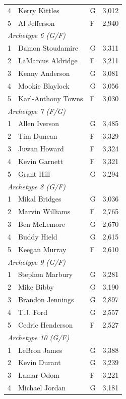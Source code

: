\begin{table}[htbp]
\begin{tabular}{rlll}
    4 & Kerry Kittles & G & 3,012 \\
    5 & Al Jefferson & F & 2,940 \\
    \midrule[0.4pt]
    \multicolumn{4}{l}{\textit{Archetype 6 (G/F)}} \\
    \midrule
    1 & Damon Stoudamire & G & 3,311 \\
    2 & LaMarcus Aldridge & F & 3,211 \\
    3 & Kenny Anderson & G & 3,081 \\
    4 & Mookie Blaylock & G & 3,056 \\
    5 & Karl-Anthony Towns & F & 3,030 \\
    \midrule[0.4pt]
    \multicolumn{4}{l}{\textit{Archetype 7 (F/G)}} \\
    \midrule
    1 & Allen Iverson & G & 3,485 \\
    2 & Tim Duncan & F & 3,329 \\
    3 & Juwan Howard & F & 3,324 \\
    4 & Kevin Garnett & F & 3,321 \\
    5 & Grant Hill & G & 3,294 \\
    \midrule[0.4pt]
    \multicolumn{4}{l}{\textit{Archetype 8 (G/F)}} \\
    \midrule
    1 & Mikal Bridges & G & 3,036 \\
    2 & Marvin Williams & F & 2,765 \\
    3 & Ben McLemore & G & 2,670 \\
    4 & Buddy Hield & G & 2,615 \\
    5 & Keegan Murray & F & 2,610 \\
    \midrule[0.4pt]
    \multicolumn{4}{l}{\textit{Archetype 9 (G/F)}} \\
    \midrule
    1 & Stephon Marbury & G & 3,281 \\
    2 & Mike Bibby & G & 3,190 \\
    3 & Brandon Jennings & G & 2,897 \\
    4 & T.J. Ford & G & 2,557 \\
    5 & Cedric Henderson & F & 2,527 \\
    \midrule[0.4pt]
    \multicolumn{4}{l}{\textit{Archetype 10 (G/F)}} \\
    \midrule
    1 & LeBron James & G & 3,388 \\
    2 & Kevin Durant & G & 3,239 \\
    3 & Lamar Odom & F & 3,221 \\
    4 & Michael Jordan & G & 3,181 \\

\end{tabular}
\end{table}
